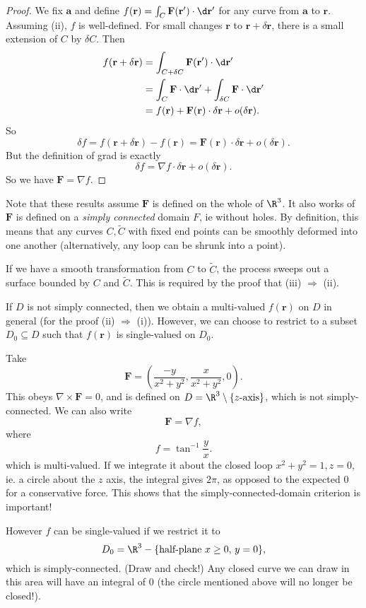 \documentclass[a4paper]{article}
\begin{document}
\begin{proof}
  We fix $\mathbf{a}$ and define $f(\mathbf{r}) = \int_C \mathbf{F}(\mathbf{r}')\cdot\d \mathbf{r}'$ for any curve from $\mathbf{a}$ to $\mathbf{r}$. Assuming (ii), $f$ is well-defined. For small changes $\mathbf{r}$ to $\mathbf{r} + \delta \mathbf{r}$, there is a small extension of $C$ by $\delta C$. Then
  \begin{align*}
    f(\mathbf{r} + \delta \mathbf{r}) &= \int_{C + \delta C}\mathbf{F} (\mathbf{r}')\cdot \d \mathbf{r}'\\
    &= \int_C \mathbf{F}\cdot \d \mathbf{r}' + \int_{\delta C}\mathbf{F}\cdot \d \mathbf{r}'\\
    &= f(\mathbf{r}) + \mathbf{F}(\mathbf{r})\cdot \delta \mathbf{r} + o(\delta \mathbf{r}).
  \end{align*}
  So
  \[
    \delta f = f(\mathbf{r} + \delta \mathbf{r}) - f(\mathbf{r}) = \mathbf{F}(\mathbf{r})\cdot \delta \mathbf{r} + o(\delta \mathbf{r}).
  \]
  But the definition of grad is exactly
  \[
    \delta f = \nabla f\cdot \delta \mathbf{r} + o(\delta \mathbf{r}).
  \]
  So we have $\mathbf{F} = \nabla f$.
\end{proof}
Note that these results assume $\mathbf{F}$ is defined on the whole of $\R^3$. It also works of $\mathbf{F}$ is defined on a \emph{simply connected} domain $F$, ie without holes. By definition, this means that any curves $C, \tilde{C}$ with fixed end points can be smoothly deformed into one another (alternatively, any loop can be shrunk into a point).

If we have a smooth transformation from $C$ to $\tilde{C}$, the process sweeps out a surface bounded by $C$ and $\tilde{C}$. This is required by the proof that (iii) $\Rightarrow$ (ii). 

If $D$ is not simply connected, then we obtain a multi-valued $f(\mathbf{r})$ on $D$ in general (for the proof (ii) $\Rightarrow$ (i)). However, we can choose to restrict to a subset $D_0\subseteq D$ such that $f(\mathbf{r})$ is single-valued on $D_0$.

\begin{eg}
  Take
  \[
    \mathbf{F} = \left(\frac{- y}{x^2 + y^2}, \frac{x}{x^2 + y^2}, 0\right).
  \]
  This obeys $\nabla\times \mathbf{F} = 0$, and is defined on $D = \R^3 \setminus \{z\text{-axis}\}$, which is not simply-connected. We can also write
  \[
    \mathbf{F} = \nabla f,
  \]
  where
  \[
    f  = \tan^{-1}\frac{y}{x}.
  \]
  which is multi-valued. If we integrate it about the closed loop $x^2 + y^2 = 1, z = 0$, ie. a circle about the $z$ axis, the integral gives $2\pi$, as opposed to the expected $0$ for a conservative force. This shows that the simply-connected-domain criterion is important!
  
  However $f$ can be single-valued if we restrict it to
  \[
    D_0 = \R^3 - \{\text{half-plane }x \geq 0,\, y = 0\},
  \]
  which is simply-connected. (Draw and check!) Any closed curve we can draw in this area will have an integral of $0$ (the circle mentioned above will no longer be closed!).
\end{eg}
\end{document}
